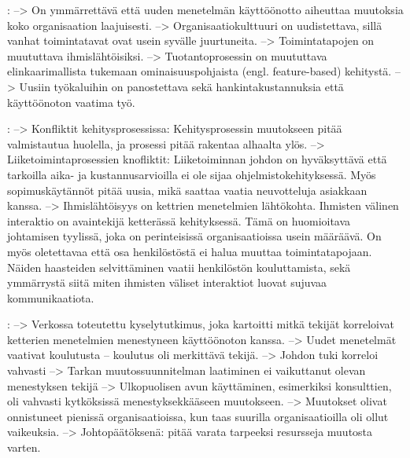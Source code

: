 \citep{Nerur2005}:
--> On ymmärrettävä että uuden menetelmän käyttöönotto aiheuttaa muutoksia koko
organisaation laajuisesti. \newline
--> Organisaatiokulttuuri on uudistettava, sillä vanhat toimintatavat ovat usein
syvälle juurtuneita. \newline
--> Toimintatapojen on muututtava ihmislähtöisiksi. \newline
--> Tuotantoprosessin on muututtava elinkaarimallista tukemaan
ominaisuuspohjaista (engl. feature-based) kehitystä. \newline
--> Uusiin työkaluihin on panostettava sekä hankintakustannuksia että
käyttöönoton vaatima työ.

\citep{Boehm2005}:
--> Konfliktit kehitysprosessissa: Kehitysprosessin muutokseen pitää
valmistautua huolella, ja prosessi pitää rakentaa alhaalta ylös. \newline
--> Liiketoimintaprosessien knofliktit: Liiketoiminnan johdon on hyväksyttävä
että tarkoilla aika- ja kustannusarvioilla ei ole sijaa ohjelmistokehityksessä.
Myös sopimuskäytännöt pitää uusia, mikä saattaa vaatia neuvotteluja asiakkaan
kanssa. \newline
--> Ihmislähtöisyys on kettrien menetelmien lähtökohta. Ihmisten välinen
interaktio on avaintekijä ketterässä kehityksessä. Tämä on huomioitava
johtamisen tyylissä, joka on perinteisissä organisaatioissa usein määräävä. On
myös oletettavaa että osa henkilöstöstä ei halua muuttaa toimintatapojaan.
Näiden haasteiden selvittäminen vaatii henkilöstön kouluttamista, sekä
ymmärrystä siitä miten ihmisten väliset interaktiot luovat sujuvaa
kommunikaatiota.

\citep{Livermore2008}:
--> Verkossa toteutettu kyselytutkimus, joka kartoitti mitkä tekijät korreloivat
ketterien menetelmien menestyneen käyttöönoton kanssa. \newline
--> Uudet menetelmät vaativat koulutusta -- koulutus oli merkittävä tekijä. \newline
--> Johdon tuki korreloi vahvasti \newline
--> Tarkan muutossuunnitelman laatiminen ei vaikuttanut olevan menestyksen tekijä \newline
--> Ulkopuolisen avun käyttäminen, esimerkiksi konsulttien, oli vahvasti
kytköksissä menestyksekkääseen muutokseen. \newline
--> Muutokset olivat onnistuneet pienissä organisaatioissa, kun taas suurilla
organisaatioilla oli ollut vaikeuksia. \newline
--> Johtopäätöksenä: pitää varata tarpeeksi resursseja muutosta varten.

